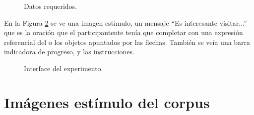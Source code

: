 \begin{figure}[t]
\begin{center}
\caption{Datos requeridos.}
\label{fig-nacionalidadGenero}
\end{center}
\end{figure}

En la Figura \ref{fig-interface} se ve una imagen est\'imulo, un mensaje ``Es interesante visitar...'' que es la oraci\'on que el participantente ten\'ia que completar con una expresi\'on referencial del o los objetos apuntados por las flechas. Tambi\'en se ve\'ia una barra indicadora de progreso, y las instrucciones. 

\begin{figure}[h]
\begin{center}
\caption{Interface del experimento.}
\label{fig-interface}
\end{center}
\end{figure}

\section{Im\'agenes est\'imulo del corpus}\label{imagenes-zoom}

